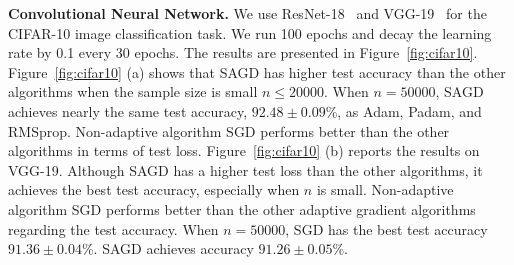 \documentclass[11pt]{article}
\begin{document}
\textbf{Convolutional Neural Network.}
We use ResNet-18~\citep{hezh2016} and VGG-19~\citep{sizi2014} for the CIFAR-10 image classification task. We run 100 epochs and decay the learning rate by 0.1 every 30 epochs. 
The results are presented in Figure~\ref{fig:cifar10}. Figure~\ref{fig:cifar10} (a) shows that \textsc{SAGD} has higher test accuracy than the 
other algorithms when the sample size is small \ie $n \leq 20000$.
When $n = 50000$, \textsc{SAGD} achieves nearly the same test accuracy, $92.48 \pm 0.09\%$,  as Adam, Padam, and RMSprop.
Non-adaptive algorithm 
SGD performs better than the other algorithms in terms of test loss. 
Figure~\ref{fig:cifar10} (b) reports the results on VGG-19. Although \textsc{SAGD} has a higher test loss than the other algorithms, it achieves the best test accuracy, especially when $n$ is small. Non-adaptive algorithm SGD performs better than the other adaptive gradient algorithms regarding the test accuracy.
When $n= 50000$, SGD has the best test accuracy $91.36 \pm 0.04\%$. \textsc{SAGD} achieves accuracy $91.26 \pm 0.05\%$.
\end{document}

